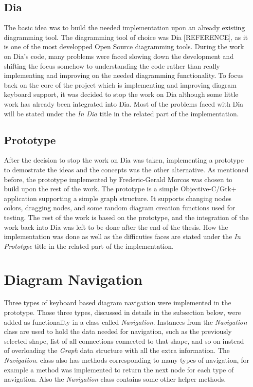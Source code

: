 \subsection{Dia}
The basic idea was to build the needed implementation upon an already existing diagramming tool. The diagramming tool of choice was Dia [REFERENCE], as it is one of the most developped Open Source diagramming tools. During the work on Dia's code, many problems were faced slowing down the development and shifting the focus somehow to understanding the code rather than really implementing and improving on the needed diagramming functionality. To focus back on the core of the project which is implementing and improving diagram keyboard support, it was decided to stop the work on Dia although some little work has already been integrated into Dia. Most of the problems faced with Dia will be stated under the {\it In Dia} title in the related part of the implementation.

\subsection{Prototype}
After the decision to stop the work on Dia was taken, implementing a prototype to demostrate the ideas and the concepts was the other alternative. As mentioned before, the prototype implemented by Frederic-Gerald Morcos was chosen to build upon the rest of the work. The prototype is a simple Objective-C/Gtk+ application supporting a simple graph structure. It supports changing nodes colors, dragging nodes, and some random diagram creation functions used for testing. The rest of the work is based on the prototype, and the integration of the work back into Dia was left to be done after the end of the thesis. How the implementation was done as well as the difficuties faces are stated under the {\it In Prototype} title in the related part of the implementation.


\section{Diagram Navigation}
Three types of keyboard based diagram navigation were implemented in the prototype. Those three types, discussed in details in the subsection below, were added as functionality in a class called {\it Navigation}. Instances from the {\it Navigation} class are used to hold the data needed for navigation, such as the previously selected shape, list of all connections connected to that shape, and so on instead of overloading the {\it Graph} data structure with all the extra information. The {\it Navigation}. class also has methods corresponding to many types of navigation, for example a method was implemented to return the next node for each type of navigation. Also the {\it Navigation} class contains some other helper methods.

